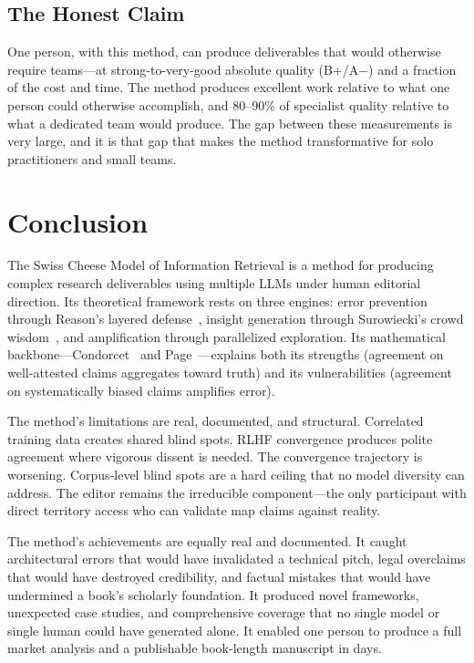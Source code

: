 \documentclass[11pt,letterpaper]{article}
\begin{document}
\subsection{The Honest Claim}

One person, with this method, can produce deliverables that would otherwise require teams---at strong-to-very-good absolute quality (B+/A$-$) and a fraction of the cost and time. The method produces excellent work relative to what one person could otherwise accomplish, and 80--90\% of specialist quality relative to what a dedicated team would produce. The gap between these measurements is very large, and it is that gap that makes the method transformative for solo practitioners and small teams.

\section{Conclusion}

The Swiss Cheese Model of Information Retrieval is a method for producing complex research deliverables using multiple LLMs under human editorial direction. Its theoretical framework rests on three engines: error prevention through Reason's layered defense~\cite{reason1990}, insight generation through Surowiecki's crowd wisdom~\cite{surowiecki2004}, and amplification through parallelized exploration. Its mathematical backbone---Condorcet~\cite{condorcet1785} and Page~\cite{page2007}---explains both its strengths (agreement on well-attested claims aggregates toward truth) and its vulnerabilities (agreement on systematically biased claims amplifies error).

The method's limitations are real, documented, and structural. Correlated training data creates shared blind spots. RLHF convergence produces polite agreement where vigorous dissent is needed. The convergence trajectory is worsening. Corpus-level blind spots are a hard ceiling that no model diversity can address. The editor remains the irreducible component---the only participant with direct territory access who can validate map claims against reality.

The method's achievements are equally real and documented. It caught architectural errors that would have invalidated a technical pitch, legal overclaims that would have destroyed credibility, and factual mistakes that would have undermined a book's scholarly foundation. It produced novel frameworks, unexpected case studies, and comprehensive coverage that no single model or single human could have generated alone. It enabled one person to produce a full market analysis and a publishable book-length manuscript in days.
\end{document}

